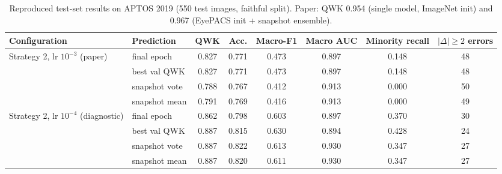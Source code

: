 \begin{table}[t]
\centering
\caption{Reproduced test-set results on APTOS 2019 (550 test images, faithful split). Paper: QWK 0.954 (single model, ImageNet init) and 0.967 (EyePACS init + snapshot ensemble).}
\label{tab:main}
\footnotesize
\begin{tabular}{llcccccc}
\toprule
Configuration & Prediction & QWK & Acc. & Macro-F1 & Macro AUC & Minority recall & $|\Delta|\geq2$ errors \\
\midrule
Strategy 2, lr $10^{-3}$ (paper) & final epoch & 0.827 & 0.771 & 0.473 & 0.897 & 0.148 & 48 \\
 & best val QWK & 0.827 & 0.771 & 0.473 & 0.897 & 0.148 & 48 \\
 & snapshot vote & 0.788 & 0.767 & 0.412 & 0.913 & 0.000 & 50 \\
 & snapshot mean & 0.791 & 0.769 & 0.416 & 0.913 & 0.000 & 49 \\
\midrule
Strategy 2, lr $10^{-4}$ (diagnostic) & final epoch & 0.862 & 0.798 & 0.603 & 0.897 & 0.370 & 30 \\
 & best val QWK & 0.887 & 0.815 & 0.630 & 0.894 & 0.428 & 24 \\
 & snapshot vote & 0.887 & 0.822 & 0.613 & 0.930 & 0.347 & 27 \\
 & snapshot mean & 0.887 & 0.820 & 0.611 & 0.930 & 0.347 & 27 \\
\bottomrule
\end{tabular}
\end{table}
